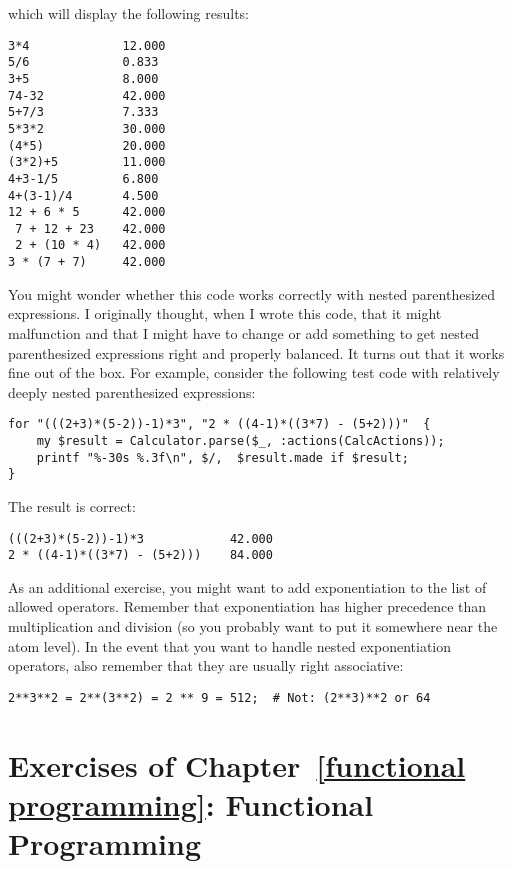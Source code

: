 which will display the following results:

\begin{verbatim}
3*4             12.000
5/6             0.833
3+5             8.000
74-32           42.000
5+7/3           7.333
5*3*2           30.000
(4*5)           20.000
(3*2)+5         11.000
4+3-1/5         6.800
4+(3-1)/4       4.500
12 + 6 * 5      42.000
 7 + 12 + 23    42.000
 2 + (10 * 4)   42.000
3 * (7 + 7)     42.000
\end{verbatim}

You might wonder whether this code works correctly with nested 
parenthesized expressions. I originally thought, when I wrote this 
code, that it might malfunction and that I might have to change 
or add something to get nested parenthesized expressions right and 
properly balanced. It turns out that it works fine out of the 
box. For example, consider the following test code with relatively 
deeply nested parenthesized expressions:

\begin{verbatim}
for "(((2+3)*(5-2))-1)*3", "2 * ((4-1)*((3*7) - (5+2)))"  { 
    my $result = Calculator.parse($_, :actions(CalcActions));
    printf "%-30s %.3f\n", $/,  $result.made if $result;
}
\end{verbatim}

The result is correct:
\begin{verbatim}
(((2+3)*(5-2))-1)*3            42.000
2 * ((4-1)*((3*7) - (5+2)))    84.000
\end{verbatim}

As an additional exercise, you might want to add exponentiation 
to the list of allowed operators. Remember that exponentiation has 
higher precedence than multiplication and division (so you probably 
want to put it somewhere near the atom level). In the event that 
you want to handle nested exponentiation operators, also 
remember that they are usually right associative:

\begin{verbatim}
2**3**2 = 2**(3**2) = 2 ** 9 = 512;  # Not: (2**3)**2 or 64
\end{verbatim}

\section{Exercises of Chapter~\ref{functional programming}: Functional Programming}

